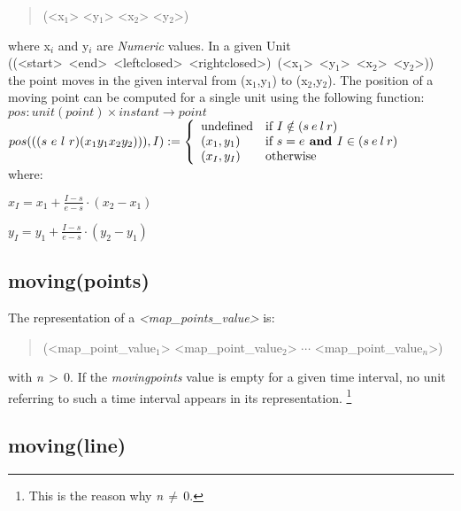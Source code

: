 \documentclass[english,a4paper]{article}
\begin{document}
\begin{quotation}
   (<x$_1$> <y$_1$> <x$_2$> <y$_2$>)
\end{quotation}
where x$_i$ and y$_i$ are \emph{Numeric} values. In a given Unit\\
\mbox{((<start> <end> <leftclosed> <rightclosed>) (<x$_1$> <y$_1$> <x$_2$> <y$_2$>))}
the point moves in the given interval from (x$_1$,y$_1$) to (x$_2$,y$_2$).
The position of a moving point can be computed for a single unit
using the following function:\\
 $ {pos} : {unit(point)} \times {instant} \rightarrow {point} $ \\
 $ {pos}(((s\ e\ l\ r) (x_1 y_1 x_2 y_2))),I) := \left\{
   \begin{array} {ll}
         \mbox{undefined} & \mbox{if } I \notin (s\: e\: l\: r) \\
         (x_1,y_1) & \mbox{if } s=e \mbox{\bf{} and } I \in (s\: e\: l\: r)\\
         (x_I,y_I) &  \mbox{otherwise}
   \end{array}
    \right. $\\[1em]

  where:\nopagebreak[4] \begin{description} \nopagebreak[4]
       \item $x_I = x_1+\frac{I-s}{e-s}\cdot(x_2 - x_1) $
       \item $y_I = y_1+\frac{I-s}{e-s}\cdot(y_2 - y_1) $
  \end{description}



\subsection{moving(points)}

The representation of a \emph{<map\_points\_value>} is:

\begin{quotation}
(<map\_point\_value$_{1}$> <map\_point\_value$_{2}$> $\cdots $
<map\_point\_value$_{n}$>)
\end{quotation}
with \emph{n}$\, >\, $0. If the \emph{movingpoints} value is empty
for a given time interval, no unit referring to such a time interval
appears in its representation.%
\footnote{This is the reason why \emph{n}$\, \neq \, $0.%
}


\subsection{moving(line)}
\end{document}
